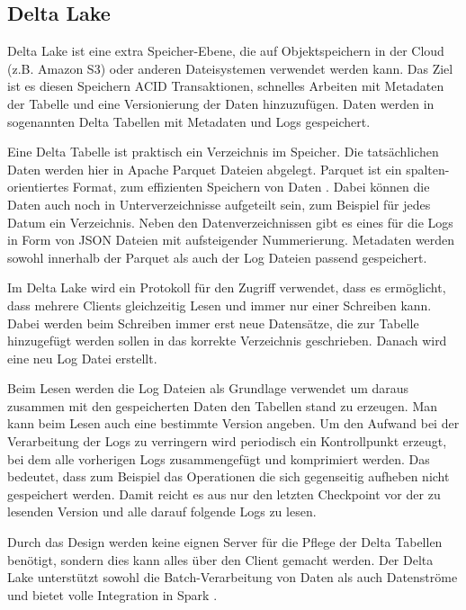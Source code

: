 \subsection{Delta Lake}

Delta Lake ist eine extra Speicher-Ebene, die auf Objektspeichern in der Cloud (z.B. Amazon S3) oder anderen Dateisystemen verwendet werden kann.
Das Ziel ist es diesen Speichern ACID Transaktionen, schnelles Arbeiten mit Metadaten der Tabelle und eine Versionierung der Daten hinzuzufügen.
Daten werden in sogenannten Delta Tabellen mit Metadaten und Logs gespeichert.

Eine Delta Tabelle ist praktisch ein Verzeichnis im Speicher.
Die tatsächlichen Daten werden hier in Apache Parquet Dateien abgelegt.
Parquet ist ein spalten-orientiertes Format, zum effizienten Speichern von Daten \parencite{parquet}.
Dabei können die Daten auch noch in Unterverzeichnisse aufgeteilt sein, zum Beispiel für jedes Datum ein Verzeichnis.
Neben den Datenverzeichnissen gibt es eines für die Logs in Form von JSON Dateien mit aufsteigender Nummerierung.
Metadaten werden sowohl innerhalb der Parquet als auch der Log Dateien passend gespeichert.

Im Delta Lake wird ein Protokoll für den Zugriff verwendet, dass es ermöglicht, dass mehrere Clients gleichzeitig Lesen und immer nur einer Schreiben kann.
Dabei werden beim Schreiben immer erst neue Datensätze, die zur Tabelle hinzugefügt werden sollen in das korrekte Verzeichnis geschrieben.
Danach wird eine neu Log Datei erstellt.

Beim Lesen werden die Log Dateien als Grundlage verwendet um daraus zusammen mit den gespeicherten Daten den Tabellen stand zu erzeugen.
Man kann beim Lesen auch eine bestimmte Version angeben.
Um den Aufwand bei der Verarbeitung der Logs zu verringern wird periodisch ein Kontrollpunkt erzeugt, bei dem alle vorherigen Logs zusammengefügt und komprimiert werden.
Das bedeutet, dass zum Beispiel das Operationen die sich gegenseitig aufheben nicht gespeichert werden.
Damit reicht es aus nur den letzten Checkpoint vor der zu lesenden Version und alle darauf folgende Logs zu lesen.

Durch das Design werden keine eignen Server für die Pflege der Delta Tabellen benötigt, sondern dies kann alles über den Client gemacht werden.
Der Delta Lake unterstützt sowohl die Batch-Verarbeitung von Daten als auch Datenströme und bietet volle Integration in Spark \parencite{deltalake}.

